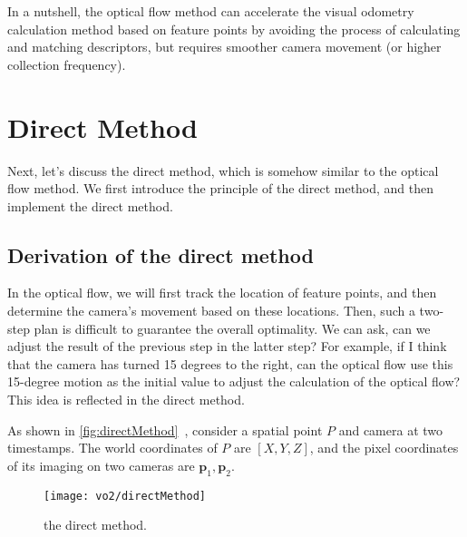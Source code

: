 In a nutshell, the optical flow method can accelerate the visual odometry calculation method based on feature points by avoiding the process of calculating and matching descriptors, but requires smoother camera movement (or higher collection frequency).

\section{Direct Method}
Next, let's discuss the direct method, which is somehow similar to the optical flow method. We first introduce the principle of the direct method, and then implement the direct method.

\subsection{Derivation of the direct method}
In the optical flow, we will first track the location of feature points, and then determine the camera's movement based on these locations. Then, such a two-step plan is difficult to guarantee the overall optimality. We can ask, can we adjust the result of the previous step in the latter step? For example, if I think that the camera has turned 15 degrees to the right, can the optical flow use this 15-degree motion as the initial value to adjust the calculation of the optical flow? This idea is reflected in the direct method.

As shown in \autoref{fig:directMethod}~, consider a spatial point $P$ and camera at two timestamps. The world coordinates of $P$ are $[X,Y,Z]$, and the pixel coordinates of its imaging on two cameras are $\mathbf{p}_1, \mathbf{p}_2$.

\begin{figure}[!htp]
	\centering
	\texttt{[image: vo2/directMethod]}
	\caption{the direct method.}
	\label{fig:directMethod}
\end{figure}

